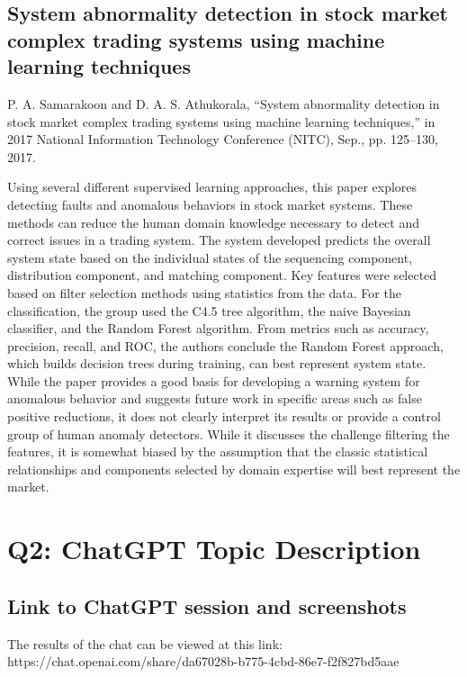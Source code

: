 \documentclass[12pt]{article}
\begin{document}
\subsection{System abnormality detection in stock market complex trading systems using machine learning techniques}
P. A. Samarakoon and D. A. S. Athukorala, “System abnormality detection in stock market complex trading systems using machine learning techniques,” in 2017 National Information Technology Conference (NITC), Sep., pp. 125–130, 2017. %
\newline

Using several different supervised learning approaches, this paper explores detecting faults and anomalous behaviors in stock market systems. These methods can reduce the human domain knowledge necessary to detect and correct issues in a trading system. The system developed predicts the overall system state based on the individual states of the sequencing component, distribution component, and matching component. Key features were selected based on filter selection methods using statistics from the data. For the classification, the group used the C4.5 tree algorithm, the naive Bayesian classifier, and the Random Forest algorithm. From metrics such as accuracy, precision, recall, and ROC, the authors conclude the Random Forest approach, which builds decision trees during training, can best represent system state. While the paper provides a good basis for developing a warning system for anomalous behavior and suggests future work in specific areas such as false positive reductions, it does not clearly interpret its results or provide a control group of human anomaly detectors. While it discusses the challenge filtering the features, it is somewhat biased by the assumption that the classic statistical relationships and components selected by domain expertise will best represent the market.



\section{Q2: ChatGPT Topic Description}
\subsection{Link to ChatGPT session and screenshots}
The results of the chat can be viewed at this link:
https://chat.openai.com/share/da67028b-b775-4cbd-86e7-f2f827bd5aae
\end{document}
